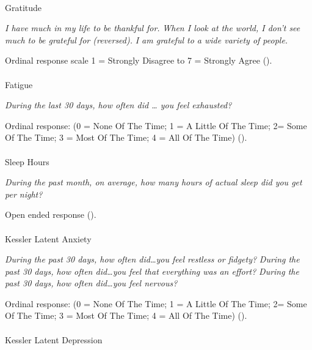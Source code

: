 \documentclass[
  single column]{article}
\makeatletter
\let\oldparagraph\paragraph
\renewcommand{\paragraph}{
    \@ifstar
      \xxxParagraphStar
      \xxxParagraphNoStar
  }
\newcommand{\xxxParagraphStar}[1]{\oldparagraph*{#1}\mbox{}}
\newcommand{\xxxParagraphNoStar}[1]{\oldparagraph{#1}\mbox{}}
\makeatother
\begin{document}
\paragraph{Gratitude}\label{gratitude-1}

\emph{I have much in my life to be thankful for.} \emph{When I look at
the world, I don't see much to be grateful for (reversed).} \emph{I am
grateful to a wide variety of people.}

Ordinal response scale 1 = Strongly Disagree to 7 = Strongly Agree
().

\paragraph{Fatigue}\label{fatigue-1}

\emph{During the last 30 days, how often did \ldots{} you feel
exhausted?}

Ordinal response: (0 = None Of The Time; 1 = A Little Of The Time; 2=
Some Of The Time; 3 = Most Of The Time; 4 = All Of The Time)
().

\paragraph{Sleep Hours}\label{sleep-hours}

\emph{During the past month, on average, how many hours of actual sleep
did you get per night?}

Open ended response ().

\paragraph{Kessler Latent Anxiety}\label{kessler-latent-anxiety}

\emph{During the past 30 days, how often did\ldots you feel restless or
fidgety?} \emph{During the past 30 days, how often did\ldots you feel
that everything was an effort?} \emph{During the past 30 days, how often
did\ldots you feel nervous?}

Ordinal response: (0 = None Of The Time; 1 = A Little Of The Time; 2=
Some Of The Time; 3 = Most Of The Time; 4 = All Of The Time)
().

\paragraph{Kessler Latent Depression}\label{kessler-latent-depression}
\end{document}
